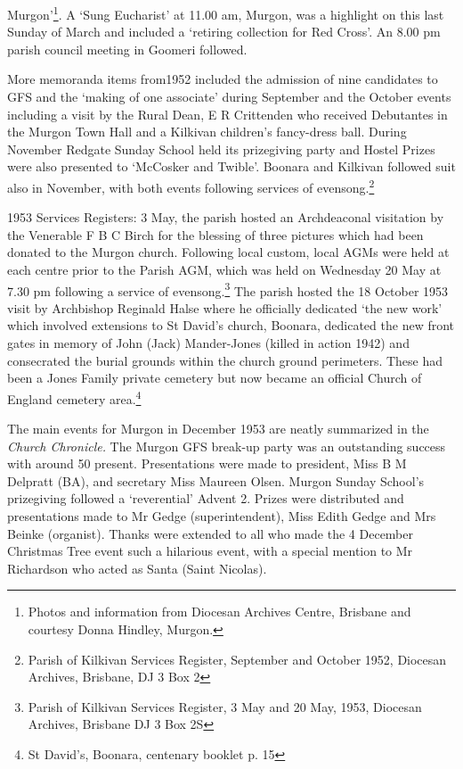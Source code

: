 Murgon'\footnote{Photos and information from Diocesan Archives Centre, Brisbane and courtesy Donna Hindley, Murgon.}. A `Sung Eucharist' at 11.00 am, Murgon, was a highlight on this last Sunday of March and included a `retiring collection for Red Cross'. An 8.00 pm parish council meeting in Goomeri followed.


More memoranda items from1952 included the admission of nine candidates to GFS and the `making of one associate' during September and the October events including a visit by the Rural Dean, E R Crittenden who received Debutantes in the Murgon Town Hall and a Kilkivan children's fancy-dress ball. During November Redgate Sunday School held its prizegiving party and Hostel Prizes were also presented to `McCosker and Twible'. Boonara and Kilkivan followed suit also in November, with both events following services of evensong.\footnote{Parish of Kilkivan Services Register, September and October 1952, Diocesan Archives, Brisbane, DJ 3 Box 2}


1953 Services Registers: 3 May, the parish hosted an Archdeaconal visitation by the Venerable F B C Birch for the blessing of three pictures which had been donated to the Murgon church. Following local custom, local AGMs were held at each centre prior to the Parish AGM, which was held on Wednesday 20 May at 7.30 pm following a service of evensong.\footnote{Parish of Kilkivan Services Register, 3 May and 20 May, 1953, Diocesan Archives, Brisbane DJ 3 Box 2S} The parish hosted the 18 October 1953 visit by Archbishop Reginald Halse where he officially dedicated `the new work' which involved extensions to St David's church, Boonara, dedicated the new front gates in memory of John (Jack) Mander-Jones (killed in action 1942) and consecrated the burial grounds within the church ground perimeters. These had been a Jones Family private cemetery but now became an official Church of England cemetery area.\footnote{St David's, Boonara, centenary booklet p. 15}


The main events for Murgon in December 1953 are neatly summarized in the \emph{Church Chronicle.} The Murgon GFS break-up party was an outstanding success with around 50 present. Presentations were made to president, Miss B M Delpratt (BA), and secretary Miss Maureen Olsen. Murgon Sunday School's prizegiving followed a `reverential' Advent 2. Prizes were distributed and presentations made to Mr Gedge (superintendent), Miss Edith Gedge and Mrs Beinke (organist). Thanks were extended to all who made the 4 December Christmas Tree event such a hilarious event, with a special mention to Mr Richardson who acted as Santa (Saint Nicolas).



